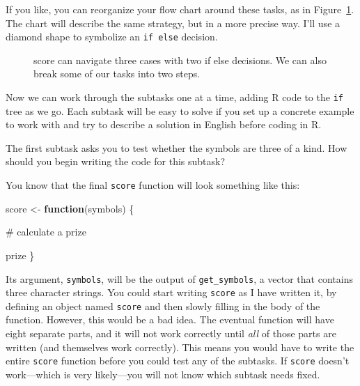 \documentclass[
  letterpaper,
  DIV=11,
  numbers=noendperiod]{scrbook}
\makeatletter
\newenvironment{Shaded}{\begin{snugshade}}{\end{snugshade}}
\newcommand{\CommentTok}[1]{\textcolor[rgb]{0.37,0.37,0.37}{#1}}
\newcommand{\ControlFlowTok}[1]{\textcolor[rgb]{0.00,0.23,0.31}{\textbf{#1}}}
\newcommand{\NormalTok}[1]{\textcolor[rgb]{0.00,0.23,0.31}{#1}}
\newcommand{\OtherTok}[1]{\textcolor[rgb]{0.00,0.23,0.31}{#1}}
\newcommand*\pandocbounded[1]{%
  \sbox\pandoc@box{#1}%
  \Gscale@div\@tempa{\textheight}{\dimexpr\ht\pandoc@box+\dp\pandoc@box\relax}%
  \Gscale@div\@tempb{\linewidth}{\wd\pandoc@box}%
  \ifdim\@tempb\p@<\@tempa\p@\let\@tempa\@tempb\fi%
  \ifdim\@tempa\p@<\p@\scalebox{\@tempa}{\usebox\pandoc@box}%
  \else\usebox{\pandoc@box}%
  \fi%
}
\makeatother
\begin{document}
If you like, you can reorganize your flow chart around these tasks, as
in Figure~\ref{fig-subdivide4}. The chart will describe the same
strategy, but in a more precise way. I'll use a diamond shape to
symbolize an \texttt{if\ else} decision.

\begin{figure}

\centering{

\pandocbounded{\texttt{[image: images/hopr\_0704.png]}}

}

\caption{\label{fig-subdivide4}score can navigate three cases with two
if else decisions. We can also break some of our tasks into two steps.}

\end{figure}%

Now we can work through the subtasks one at a time, adding R code to the
\texttt{if} tree as we go. Each subtask will be easy to solve if you set
up a concrete example to work with and try to describe a solution in
English before coding in R.

The first subtask asks you to test whether the symbols are three of a
kind. How should you begin writing the code for this subtask?

You know that the final \texttt{score} function will look something like
this:

\begin{Shaded}
\begin{Highlighting}[]
\NormalTok{score }\OtherTok{\textless{}{-}} \ControlFlowTok{function}\NormalTok{(symbols) \{}

  \CommentTok{\# calculate a prize}

\NormalTok{  prize}
\NormalTok{\}}
\end{Highlighting}
\end{Shaded}

Its argument, \texttt{symbols}, will be the output of
\texttt{get\_symbols}, a vector that contains three character strings.
You could start writing \texttt{score} as I have written it, by defining
an object named \texttt{score} and then slowly filling in the body of
the function. However, this would be a bad idea. The eventual function
will have eight separate parts, and it will not work correctly until
\emph{all} of those parts are written (and themselves work correctly).
This means you would have to write the entire \texttt{score} function
before you could test any of the subtasks. If \texttt{score} doesn't
work---which is very likely---you will not know which subtask needs
fixed.
\end{document}
